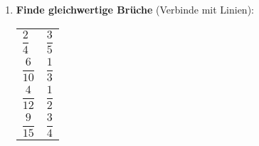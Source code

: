 \begin{enumerate}[resume, label=\arabic*.]
    \item \textbf{Finde gleichwertige Brüche} (Verbinde mit Linien):

    \begin{center}
        \begin{tabular}{p{4cm}p{4cm}}
            \Large $\dfrac{2}{4}$ & \Large $\dfrac{3}{5}$ \\[3ex]
            \Large $\dfrac{6}{10}$ & \Large $\dfrac{1}{3}$ \\[3ex]
            \Large $\dfrac{4}{12}$ & \Large $\dfrac{1}{2}$ \\[3ex]
            \Large $\dfrac{9}{15}$ & \Large $\dfrac{3}{4}$ \\
        \end{tabular}
    \end{center}
\end{enumerate}